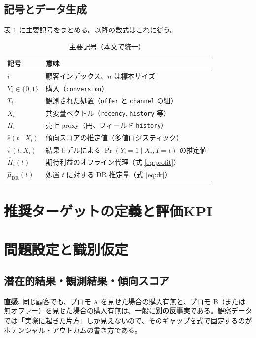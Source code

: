 \documentclass[11pt,a4paper]{article}
\newcommand{\hehat}{\hat{e}}
\newcommand{\pihat}{\hat{\pi}}
\newcommand{\muDRhat}{\hat{\mu}_{\mathrm{DR}}}
\newcommand{\Pihat}{\widehat{\Pi}}
\begin{document}
\subsection{記号とデータ生成}
表 \ref{tab:notation} に主要記号をまとめる。以降の数式はこれに従う。
\begin{table}[!ht]
\centering
\caption{主要記号（本文で統一）}
\label{tab:notation}
\begin{tabular}{@{}ll@{}}
\toprule
記号 & 意味 \\
\midrule
$i$ & 顧客インデックス、$n$ は標本サイズ \\
$Y_i \in \{0,1\}$ & 購入（\texttt{conversion}） \\
$T_i$ & 観測された処置（\texttt{offer} と \texttt{channel} の組） \\
$X_i$ & 共変量ベクトル（\texttt{recency}, \texttt{history} 等） \\
$H_i$ & 売上 proxy（円、フィールド \texttt{history}） \\
$\hehat(t \mid X_i)$ & 傾向スコアの推定値（多値ロジスティック） \\
$\pihat(t, X_i)$ & 結果モデルによる $\Pr(Y_i{=}1 \mid X_i, T{=}t)$ の推定値 \\
$\Pihat_i(t)$ & 期待利益のオフライン代理（式 \eqref{eq:profit}） \\
$\muDRhat(t)$ & 処置 $t$ に対する DR 推定量（式 \eqref{eq:dr}） \\
\bottomrule
\end{tabular}
\end{table}

\newpage
\FloatBarrier
\section{推奨ターゲットの定義と評価KPI}
\label{sec:target_kpi}



\newpage
\FloatBarrier
\section{問題設定と識別仮定}
\label{sec:problem_setup}

\subsection{潜在的結果・観測結果・傾向スコア}
\textbf{直感.} 同じ顧客でも、プロモ A を見せた場合の購入有無と、プロモ B（または無オファー）を見せた場合の購入有無は、一般に\textbf{別の反事実}である。観察データでは「実際に起きた片方」しか見えないので、そのギャップを式で固定するのがポテンシャル・アウトカムの書き方である。
\end{document}
